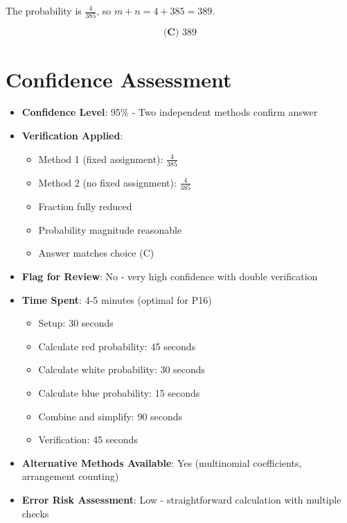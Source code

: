 \documentclass[12pt]{article}
\begin{document}
The probability is $\frac{4}{385}$, so $m + n = 4 + 385 = 389$.

$$\boxed{\textbf{(C) } 389}$$

\section*{Confidence Assessment}

\begin{itemize}[leftmargin=*]
    \item \textbf{Confidence Level}: 95\% - Two independent methods confirm answer
    
    \item \textbf{Verification Applied}: 
    \begin{itemize}
        \item Method 1 (fixed assignment): $\frac{4}{385}$ \checkmark
        \item Method 2 (no fixed assignment): $\frac{4}{385}$ \checkmark
        \item Fraction fully reduced \checkmark
        \item Probability magnitude reasonable \checkmark
        \item Answer matches choice (C) \checkmark
    \end{itemize}
    
    \item \textbf{Flag for Review}: No - very high confidence with double verification
    
    \item \textbf{Time Spent}: 4-5 minutes (optimal for P16)
    \begin{itemize}
        \item Setup: 30 seconds
        \item Calculate red probability: 45 seconds
        \item Calculate white probability: 30 seconds
        \item Calculate blue probability: 15 seconds
        \item Combine and simplify: 90 seconds
        \item Verification: 45 seconds
    \end{itemize}
    
    \item \textbf{Alternative Methods Available}: Yes (multinomial coefficients, arrangement counting)
    
    \item \textbf{Error Risk Assessment}: Low - straightforward calculation with multiple checks
\end{itemize}
\end{document}
